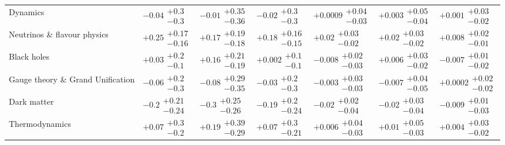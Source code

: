 \begin{table}[H]
\begin{tabular}{lllllll}
Dynamics & $-0.04\substack{+0.3 \\ -0.3}$ & $-0.01\substack{+0.35 \\ -0.36}$ & $-0.02\substack{+0.3 \\ -0.3}$ & $+0.0009\substack{+0.04 \\ -0.03}$ & $+0.003\substack{+0.05 \\ -0.04}$ & $+0.001\substack{+0.03 \\ -0.02}$ \\
Neutrinos \& flavour physics & $\bm{+0.25}\substack{+0.17 \\ -0.16}$ & $+0.17\substack{+0.19 \\ -0.18}$ & $\bm{+0.18}\substack{+0.16 \\ -0.15}$ & $\bm{+0.02}\substack{+0.03 \\ -0.02}$ & $+0.02\substack{+0.03 \\ -0.02}$ & $+0.008\substack{+0.02 \\ -0.01}$ \\
Black holes & $+0.03\substack{+0.2 \\ -0.1}$ & $+0.16\substack{+0.21 \\ -0.19}$ & $+0.002\substack{+0.1 \\ -0.1}$ & $-0.008\substack{+0.02 \\ -0.03}$ & $+0.006\substack{+0.03 \\ -0.02}$ & $-0.007\substack{+0.01 \\ -0.02}$ \\
Gauge theory \& Grand Unification & $-0.06\substack{+0.2 \\ -0.3}$ & $-0.08\substack{+0.29 \\ -0.35}$ & $-0.03\substack{+0.2 \\ -0.3}$ & $-0.003\substack{+0.03 \\ -0.03}$ & $-0.007\substack{+0.04 \\ -0.05}$ & $+0.0002\substack{+0.02 \\ -0.02}$ \\
Dark matter & $-0.2\substack{+0.21 \\ -0.24}$ & $\bm{-0.3}\substack{+0.25 \\ -0.26}$ & $-0.19\substack{+0.2 \\ -0.24}$ & $-0.02\substack{+0.02 \\ -0.04}$ & $-0.02\substack{+0.03 \\ -0.04}$ & $-0.009\substack{+0.01 \\ -0.03}$ \\
Thermodynamics & $+0.07\substack{+0.3 \\ -0.2}$ & $+0.19\substack{+0.39 \\ -0.29}$ & $+0.07\substack{+0.3 \\ -0.21}$ & $+0.006\substack{+0.04 \\ -0.03}$ & $+0.01\substack{+0.05 \\ -0.03}$ & $+0.004\substack{+0.03 \\ -0.02}$ \\

\end{tabular}
\end{table}
